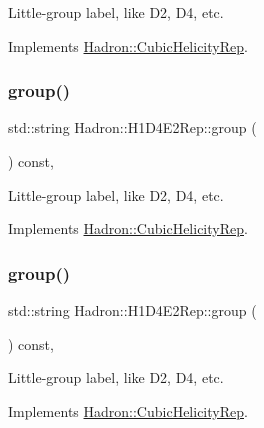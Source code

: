 Little-\/group label, like D2, D4, etc. 

Implements \mbox{\hyperlink{structHadron_1_1CubicHelicityRep_a101a7d76cd8ccdad0f272db44b766113}{Hadron\+::\+Cubic\+Helicity\+Rep}}.

\mbox{\label{structHadron_1_1H1D4E2Rep_a136d615d32a53559950775a7e07d5650}} 
\subsubsection{\texorpdfstring{group()}{group()}\hspace{0.1cm}{\footnotesize\ttfamily [3/5]}}
{\footnotesize\ttfamily std\+::string Hadron\+::\+H1\+D4\+E2\+Rep\+::group (\begin{DoxyParamCaption}{ }\end{DoxyParamCaption}) const\hspace{0.3cm}{\ttfamily [inline]}, {\ttfamily [virtual]}}

Little-\/group label, like D2, D4, etc. 

Implements \mbox{\hyperlink{structHadron_1_1CubicHelicityRep_a101a7d76cd8ccdad0f272db44b766113}{Hadron\+::\+Cubic\+Helicity\+Rep}}.

\mbox{\label{structHadron_1_1H1D4E2Rep_a136d615d32a53559950775a7e07d5650}} 
\subsubsection{\texorpdfstring{group()}{group()}\hspace{0.1cm}{\footnotesize\ttfamily [4/5]}}
{\footnotesize\ttfamily std\+::string Hadron\+::\+H1\+D4\+E2\+Rep\+::group (\begin{DoxyParamCaption}{ }\end{DoxyParamCaption}) const\hspace{0.3cm}{\ttfamily [inline]}, {\ttfamily [virtual]}}

Little-\/group label, like D2, D4, etc. 

Implements \mbox{\hyperlink{structHadron_1_1CubicHelicityRep_a101a7d76cd8ccdad0f272db44b766113}{Hadron\+::\+Cubic\+Helicity\+Rep}}.

\mbox{\label{structHadron_1_1H1D4E2Rep_a136d615d32a53559950775a7e07d5650}} 
